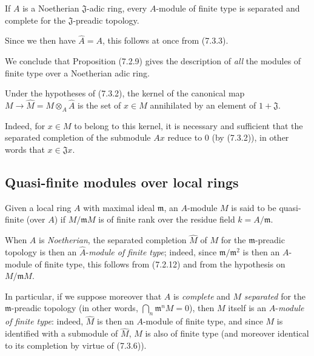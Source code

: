 \begin{corollary}[7.3.6]
\label{0.7.3.6}
If $A$ is a Noetherian $\mathfrak J$-adic ring, every $A$-module of finite
type is separated and complete for the $\mathfrak J$-preadic topology.
\end{corollary}

Since we then have $\widehat A=A$, this follows at once from (7.3.3).

We conclude that Proposition (7.2.9) gives the description of \emph{all} the
modules of finite type over a Noetherian adic ring.

\begin{corollary}[7.3.7]
\label{0.7.3.7}
Under the hypotheses of (7.3.2), the kernel of the canonical map
$M\to\widehat M=M\otimes_A\widehat A$ is the set of $x\in M$ annihilated by
an element of $1+\mathfrak J$.
\end{corollary}

Indeed, for $x\in M$ to belong to this kernel, it is necessary and sufficient that
the separated completion of the submodule $Ax$ reduce to 0 (by (7.3.2)), in other
words that $x\in\mathfrak Jx$.

\subsection{Quasi-finite modules over local rings}
\label{subsection:0.7.4}

\begin{definition}[7.4.1]
\label{0.7.4.1}
Given a local ring $A$ with maximal ideal $\mathfrak m$, an
$A$-module $M$ is said to be quasi-finite (over $A$) if $M/\mathfrak mM$ is of finite rank
over the residue field $k=A/\mathfrak m$.
\end{definition}

When $A$ is \emph{Noetherian}, the separated completion $\widehat M$ of $M$ for the
$\mathfrak m$-preadic topology is then an
$\widehat A$-\emph{module of finite type}; indeed, since
$\mathfrak m/\mathfrak m^2$ is then an $A$-module of finite type, this follows
from (7.2.12) and from the hypothesis on $M/\mathfrak mM$.

In particular, if we suppose moreover that $A$ is \emph{complete} and $M$
\emph{separated} for the $\mathfrak m$-preadic topology (in other words,
$\bigcap_n\mathfrak m^nM=0$), then $M$ itself is an
$A$-\emph{module of finite type}: indeed, $\widehat M$ is then an
$A$-module of finite type, and since $M$ is identified with a submodule of
$\widehat M$, $M$ is also of finite type (and moreover identical to its
completion by virtue of (7.3.6)).

